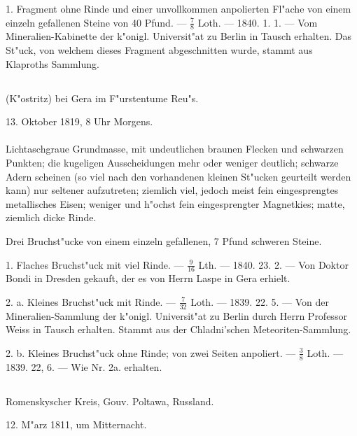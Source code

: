 \documentclass[a4paper, 11pt, oneside, polutonikogreek, german]{article}
\begin{document}
1. Fragment ohne Rinde und einer unvollkommen anpolierten Fl"ache von einem einzeln gefallenen Steine von 40 Pfund. --- $\frac{7}{8}$ Loth. --- 1840. 1. 1. --- Vom Mineralien-Kabinette der k"onigl. Universit"at zu Berlin in Tausch erhalten. Das St"uck, von welchem dieses Fragment abgeschnitten wurde, stammt aus Klaproths Sammlung.
\subsection{}
\begin{center}

(K"ostritz) bei Gera im F"urstentume Reu"s.

13. Oktober 1819, 8 Uhr Morgens.
\end{center}
\paragraph{}
Lichtaschgraue Grundmasse, mit undeutlichen braunen Flecken und schwarzen Punkten; die kugeligen Ausscheidungen mehr oder weniger deutlich; schwarze Adern scheinen (so viel nach den vorhandenen kleinen St"ucken geurteilt werden kann) nur seltener aufzutreten; ziemlich viel, jedoch meist fein eingesprengtes metallisches Eisen; weniger und h"ochst fein eingesprengter Magnetkies; matte, ziemlich dicke Rinde.

Drei Bruchst"ucke von einem einzeln gefallenen, 7 Pfund schweren Steine.

1. Flaches Bruchst"uck mit viel Rinde. --- $\frac{9}{16}$ Lth. --- 1840. 23. 2. --- Von Doktor Bondi in Dresden gekauft, der es von Herrn Laspe in Gera erhielt.

2. a. Kleines Bruchst"uck mit Rinde. --- $\frac{7}{32}$ Loth. --- 1839. 22. 5. --- Von der Mineralien-Sammlung der k"onigl. Universit"at zu Berlin durch Herrn Professor Weiss in Tausch erhalten. Stammt aus der Chladni'schen Meteoriten-Sammlung.

2. b. Kleines Bruchst"uck ohne Rinde; von zwei Seiten anpoliert. --- $\frac{3}{8}$ Loth. --- 1839. 22, 6. --- Wie Nr. 2a. erhalten.
\subsection{}
\begin{center}

Romenskyscher Kreis, Gouv. Poltawa, Russland.

12. M"arz 1811, um Mitternacht.
\end{center}
\end{document}

